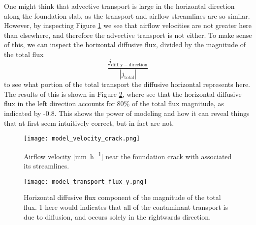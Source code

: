 One might think that advective transport is large in the horizontal direction along the foundation slab, as the transport and airflow streamlines are so similar.
However, by inspecting Figure \ref{fig:model_velocity_crack} we see that airflow velocities are not greater here than elsewhere, and therefore the advective transport is not either.
To make sense of this, we can inspect the horizontal diffusive flux, divided by the magnitude of the total flux
\begin{equation}
  \frac{j_\mathrm{diff,y-direction}}{|j_\mathrm{total}|}
\end{equation}
to see what portion of the total transport the diffusive horizontal represents here.
The results of this is shown in Figure \ref{fig:model_horizontal_diff}, where see that the horizontal diffusive flux in the left direction accounts for 80\% of the total flux magnitude, as indicated by -0.8. %
This shows the power of modeling and how it can reveal things that at first seem intuitively correct, but in fact are not.\par

\begin{figure}[htb!]
  \centering
  \texttt{[image: model\_velocity\_crack.png]}
  \caption{Airflow velocity [\si{\milli\metre\per\hour}] near the foundation crack with associated its streamlines.}
  \label{fig:model_velocity_crack}
\end{figure}

\begin{figure}[htb!]
  \centering
  \texttt{[image: model\_transport\_flux\_y.png]}
  \caption{Horizontal diffusive flux component of the magnitude of the total flux. 1 here would indicates that all of the contaminant transport is due to diffusion, and occurs solely in the rightwards direction.}
  \label{fig:model_horizontal_diff}
\end{figure}

